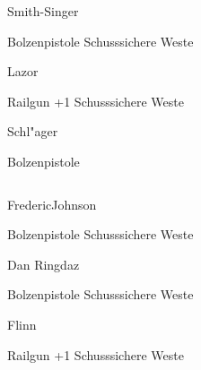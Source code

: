 \begin{column}[l]{0.45}
    \begin{nscsheet}[h]{Smith-Singer}
        \nscstats[ATT=2,AGG=2,DEX=2,COM=3]
        \nscruler
        \begin{nscinventory}
            \nscitem[Waffen] Bolzenpistole
            \nscitem[R"ustung] Schusssichere Weste
        \end{nscinventory}
    \end{nscsheet}

    \begin{nscsheet}[h]{Lazor}
        \nscstats[ATT=3,AGG=2]
        \nscruler
        \begin{nscinventory}
            \nscitem[Waffen] Railgun +1
            \nscitem[R"ustung] Schusssichere Weste
        \end{nscinventory}
    \end{nscsheet}


    \begin{nscsheet}[h]{Schl"ager}
        \nscstats[]
        \nscruler
        \begin{nscinventory}
            \nscitem[Waffen] Bolzenpistole
        \end{nscinventory}
    \end{nscsheet}    
\end{column}
\begin{column}[r]{0.45}
    \begin{nscsheet}[h]{Frederic\newline{}Johnson}
        \nscstats[ATT=2,COM=3]
        \nscruler
        \begin{nscinventory}
            \nscitem[Waffen] Bolzenpistole
            \nscitem[R"ustung] Schusssichere Weste
        \end{nscinventory}
    \end{nscsheet}

    \begin{nscsheet}[h]{Dan Ringdaz}
        \nscstats[ATT=2,AGG=2,COM=2]
        \nscruler
        \begin{nscinventory}
            \nscitem[Waffen] Bolzenpistole
            \nscitem[R"ustung] Schusssichere Weste
        \end{nscinventory}
    \end{nscsheet}

    \begin{nscsheet}[h]{Flinn}
        \nscstats[ATT=2,AGG=]
        \nscruler
        \begin{nscinventory}
            \nscitem[Waffen] Railgun +1
            \nscitem[R"ustung] Schusssichere Weste
        \end{nscinventory}
    \end{nscsheet}
\end{column}
\vfill
\pagebreak
